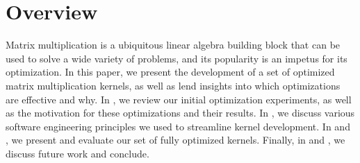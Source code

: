 
\section{Overview}
Matrix multiplication is a ubiquitous linear algebra building block that can be
used to solve a wide variety of problems, and its popularity is an impetus for
its optimization. In this paper, we present the development of a set of
optimized matrix multiplication kernels, as well as lend insights into which
optimizations are effective and why. In , we review our initial
optimization experiments, as well as the motivation for these optimizations and
their results. In , we discuss various software engineering
principles we used to streamline kernel development. In  and
, we present and evaluate our set of fully optimized kernels.
Finally, in  and , we discuss future work and
conclude.
